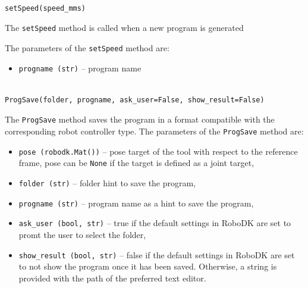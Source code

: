 \begin{verbatim}

setSpeed(speed_mms)

\end{verbatim}

The \texttt{setSpeed} method is called when a new program is generated


The parameters of the  \texttt{setSpeed} method are:

\begin{itemize}

\item \texttt{progname (str)} -- program name

\end{itemize}

\begin{verbatim}

ProgSave(folder, progname, ask_user=False, show_result=False)

\end{verbatim}

The \texttt{ProgSave} method saves the program in a format compatible with the corresponding robot controller type. 
The parameters of the \texttt{ProgSave} method are:

\begin{itemize}

\item \texttt{pose (robodk.Mat())} -- pose target of the tool with respect to the reference frame, pose can be \texttt{None} if the target is defined as a joint target,

\item \texttt{folder (str)} -- folder hint to save the program,

\item \texttt{progname (str)} -- program name as a hint to save the program,

\item \texttt{ask_user (bool, str)} -- true if the default settings in RoboDK are set to promt the user to select the folder, 

\item \texttt{show_result (bool, str)} -- false if the default settings in RoboDK are set to not show the program once it has been saved. Otherwise, a string is provided with the path of the preferred text editor.

\end{itemize}

